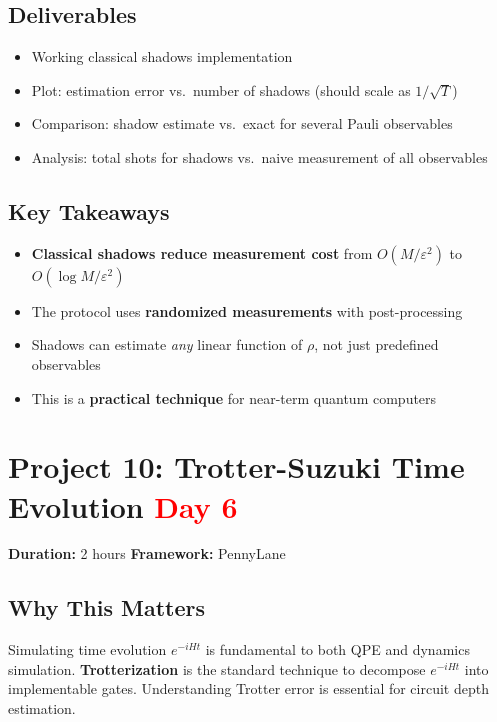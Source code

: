 \documentclass[11pt,a4paper]{article}
\begin{document}
\subsection*{Deliverables}
\begin{itemize}
    \item[\checkmark] Working classical shadows implementation
    \item[\checkmark] Plot: estimation error vs.\ number of shadows (should scale as $1/\sqrt{T}$)
    \item[\checkmark] Comparison: shadow estimate vs.\ exact for several Pauli observables
    \item[\checkmark] Analysis: total shots for shadows vs.\ naive measurement of all observables
\end{itemize}

\subsection*{Key Takeaways}
\begin{itemize}
    \item \textbf{Classical shadows reduce measurement cost} from $O(M/\varepsilon^2)$ to $O(\log M / \varepsilon^2)$
    \item The protocol uses \textbf{randomized measurements} with post-processing
    \item Shadows can estimate \textit{any} linear function of $\rho$, not just predefined observables
    \item This is a \textbf{practical technique} for near-term quantum computers
\end{itemize}


\section{Project 10: Trotter-Suzuki Time Evolution \hfill \textcolor{red}{\textbf{Day 6}}}

\begin{questionbox}
\textbf{Duration:} 2 hours \quad \textbf{Framework:} PennyLane
\end{questionbox}

\subsection*{Why This Matters}
Simulating time evolution $e^{-iHt}$ is fundamental to both QPE and dynamics simulation. \textbf{Trotterization} is the standard technique to decompose $e^{-iHt}$ into implementable gates. Understanding Trotter error is essential for circuit depth estimation.
\end{document}
